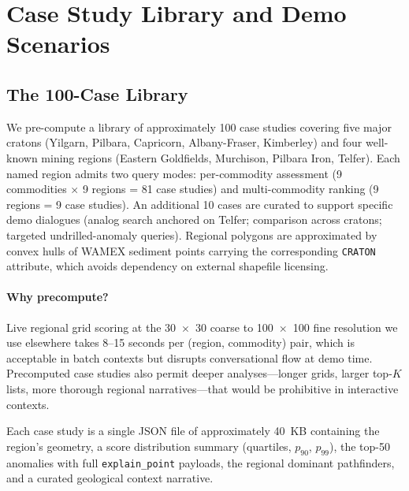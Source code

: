 \documentclass[11pt]{article}
\begin{document}
\section{Case Study Library and Demo Scenarios}
\label{sec:casestudy}


\subsection{The 100-Case Library}

We pre-compute a library of approximately 100 case studies covering
five major cratons (Yilgarn, Pilbara, Capricorn, Albany-Fraser,
Kimberley) and four well-known mining regions (Eastern Goldfields,
Murchison, Pilbara Iron, Telfer). Each named region admits two query
modes: per-commodity assessment (9 commodities $\times$ 9 regions =
81 case studies) and multi-commodity ranking (9 regions = 9 case
studies). An additional 10 cases are curated to support
specific demo dialogues (analog search anchored on Telfer; comparison
across cratons; targeted undrilled-anomaly queries).
Regional polygons are approximated by convex hulls of WAMEX sediment
points carrying the corresponding \texttt{CRATON} attribute, which
avoids dependency on external shapefile licensing.

\paragraph{Why precompute?}
Live regional grid scoring at the 30~$\times$~30 coarse to
100~$\times$~100 fine resolution we use elsewhere takes 8--15
seconds per (region, commodity) pair, which is acceptable in batch
contexts but disrupts conversational flow at demo time. Precomputed
case studies also permit deeper analyses---longer grids, larger
top-$K$ lists, more thorough regional narratives---that would be
prohibitive in interactive contexts.

Each case study is a single JSON file of approximately 40~KB
containing the region's geometry, a score distribution summary
(quartiles, $p_{90}$, $p_{99}$), the top-50 anomalies with full
\texttt{explain\_point} payloads, the regional dominant pathfinders,
and a curated geological context narrative.
\end{document}
